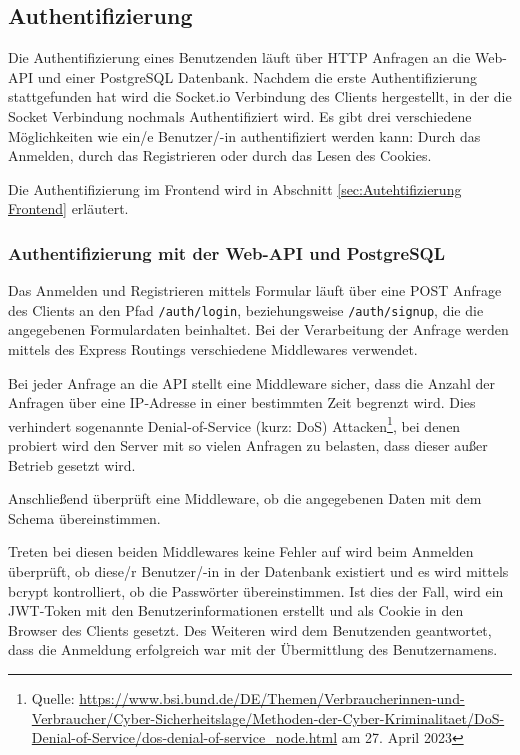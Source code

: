 \subsection{Authentifizierung}
\label{sec:Authentifizierung Backend}
Die Authentifizierung eines Benutzenden läuft über HTTP Anfragen an die Web-API und einer PostgreSQL Datenbank.
Nachdem die erste Authentifizierung stattgefunden hat wird die Socket.io Verbindung des Clients hergestellt, in der die Socket Verbindung nochmals Authentifiziert wird.
Es gibt drei verschiedene Möglichkeiten wie ein/e Benutzer/-in authentifiziert werden kann: Durch das Anmelden, durch das Registrieren oder durch das Lesen des Cookies.

Die Authentifizierung im Frontend wird in Abschnitt \ref{sec:Autehtifizierung Frontend} erläutert.

\subsubsection{Authentifizierung mit der Web-API und PostgreSQL}
Das Anmelden und Registrieren mittels Formular läuft über eine POST Anfrage des Clients an den Pfad \verb|/auth/login|, beziehungsweise \verb|/auth/signup|, die die angegebenen Formulardaten beinhaltet. Bei der Verarbeitung der Anfrage werden mittels des Express Routings verschiedene Middlewares verwendet.

Bei jeder Anfrage an die API stellt eine Middleware sicher, dass die Anzahl der Anfragen über eine IP-Adresse in einer bestimmten Zeit begrenzt wird. Dies verhindert sogenannte Denial-of-Service (kurz: DoS) Attacken\footnote{Quelle: \url{https://www.bsi.bund.de/DE/Themen/Verbraucherinnen-und-Verbraucher/Cyber-Sicherheitslage/Methoden-der-Cyber-Kriminalitaet/DoS-Denial-of-Service/dos-denial-of-service_node.html} am 27. April 2023}, bei denen probiert wird den Server mit so vielen Anfragen zu belasten, dass dieser außer Betrieb gesetzt wird.

Anschließend überprüft eine Middleware, ob die angegebenen Daten mit dem Schema übereinstimmen. 

Treten bei diesen beiden Middlewares keine Fehler auf wird beim Anmelden überprüft, ob diese/r Benutzer/-in in der Datenbank existiert und es wird mittels bcrypt kontrolliert, ob die Passwörter übereinstimmen. Ist dies der Fall, wird ein JWT-Token mit den Benutzerinformationen erstellt und als Cookie in den Browser des Clients gesetzt. Des Weiteren wird dem Benutzenden geantwortet, dass die Anmeldung erfolgreich war mit der Übermittlung des Benutzernamens.

